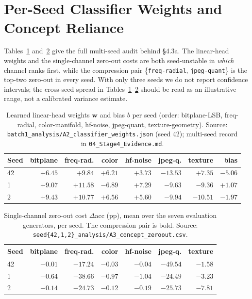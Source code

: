 \section{Per-Seed Classifier Weights and Concept Reliance}
\label{app:seeds}

Tables~\ref{tab:seed-weights} and~\ref{tab:seed-zeroout} give the full multi-seed audit
behind \S{}4.3a. The linear-head weights and the single-channel zero-out costs are both
seed-unstable in \emph{which} channel ranks first, while the compression pair
\{\texttt{freq-radial}, \texttt{jpeg-quant}\} is the top-two zero-out in every seed.
With only three seeds we do not report confidence intervals; the cross-seed spread in
Tables~\ref{tab:seed-weights}--\ref{tab:seed-zeroout} should be read as an illustrative
range, not a calibrated variance estimate.

\begin{table}[h]
  \centering
  \caption{Learned linear-head weights $\mathbf{w}$ and bias $b$ per seed (order:
    bitplane-LSB, freq-radial, color-manifold, hf-noise, jpeg-quant, texture-geometry).
    Source: \texttt{batch1\_analysis/A2\_classifier\_weights.json} (seed 42); multi-seed
    record in \texttt{04\_Stage4\_Evidence.md}.}
  \label{tab:seed-weights}
  \small
  \begin{tabular}{lrrrrrrr}
    \toprule
    Seed & bitplane & freq-rad. & color & hf-noise & jpeg-q. & texture & bias \\
    \midrule
    42 & $+6.45$ & $+9.84$ & $+6.21$ & $+3.73$ & $\mathbf{-13.53}$ & $+7.35$ & $-5.06$ \\
    1  & $+9.07$ & $\mathbf{+11.58}$ & $-6.89$ & $+7.29$ & $-9.63$ & $-9.36$ & $+1.07$ \\
    2  & $+9.43$ & $\mathbf{+10.77}$ & $+6.56$ & $+5.60$ & $-9.94$ & $-10.51$ & $-1.97$ \\
    \bottomrule
  \end{tabular}
\end{table}

\begin{table}[h]
  \centering
  \caption{Single-channel zero-out cost $\Delta$acc (pp), mean over the seven evaluation
    generators, per seed. The compression pair is bold. Source:
    \texttt{seed\{42,1,2\}\_analysis/A3\_concept\_zeroout.csv}.}
  \label{tab:seed-zeroout}
  \small
  \begin{tabular}{lrrrrrr}
    \toprule
    Seed & bitplane & freq-rad. & color & hf-noise & jpeg-q. & texture \\
    \midrule
    42 & $-0.01$ & $\mathbf{-17.24}$ & $-0.03$ & $-0.04$ & $\mathbf{-49.54}$ & $-1.58$ \\
    1  & $-0.64$ & $\mathbf{-38.66}$ & $-0.97$ & $-1.04$ & $\mathbf{-24.49}$ & $-3.23$ \\
    2  & $-0.14$ & $\mathbf{-24.73}$ & $-0.12$ & $-0.19$ & $\mathbf{-25.73}$ & $-7.81$ \\
    \bottomrule
  \end{tabular}
\end{table}

